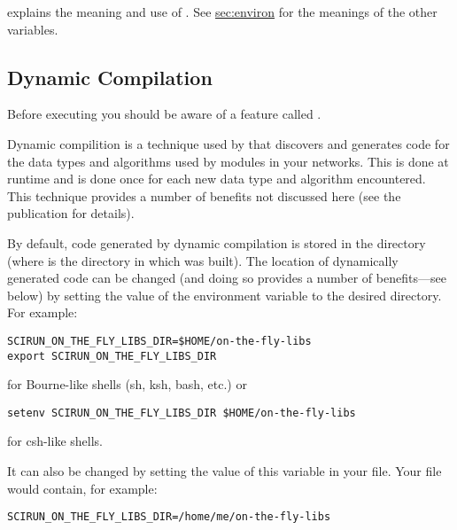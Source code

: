  explains the meaning and use
of .  See \hyperref{the
  previous section}{Section~}{}{sec:environ}
for the meanings of the other variables.

\subsection{Dynamic Compilation}
\label{sec:dyncomp}

Before executing \sr{} you should be aware of a feature called
.

Dynamic compilition is a technique used by \sr{} that discovers and
generates code for the data types and algorithms used by modules in
your networks.  This is done at runtime and is done once for each new
data type and algorithm encountered.  This technique provides a number
of benefits not discussed here (see the publication 
for details).

By default, code generated by dynamic compilation is stored in the
directory  (where
 is the directory in which \sr{} was built).  The
location of dynamically generated code can be changed (and doing so
provides a number of benefits---see below) by setting the value of the
environment variable  to the
desired directory. For example:

\begin{verbatim}
SCIRUN_ON_THE_FLY_LIBS_DIR=$HOME/on-the-fly-libs
export SCIRUN_ON_THE_FLY_LIBS_DIR
\end{verbatim}

for Bourne-like shells (sh, ksh, bash, etc.) or

\begin{verbatim}
setenv SCIRUN_ON_THE_FLY_LIBS_DIR $HOME/on-the-fly-libs
\end{verbatim}

for csh-like shells.

It can also be changed by setting the value of this variable in
your 
file. Your  file would contain, for example:

\begin{verbatim}
SCIRUN_ON_THE_FLY_LIBS_DIR=/home/me/on-the-fly-libs
\end{verbatim}

